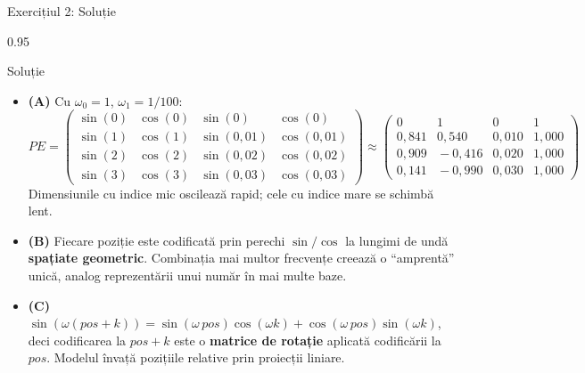 \documentclass[9pt, aspectratio=169, t]{beamer}
\begin{document}
\begin{frame}{Exercițiul 2: Soluție}
    \begin{cminipage}{0.95\textwidth}
    \begin{exampleblock}{Soluție}
        {\scriptsize
        \begin{itemize}\setlength{\itemsep}{1pt}
            \item \textcolor{MainBlue}{\textbf{(A)}} Cu $\omega_0 = 1$, $\omega_1 = 1/100$:
                \[
                    PE = \begin{pmatrix}
                        \sin(0) & \cos(0) & \sin(0) & \cos(0) \\
                        \sin(1) & \cos(1) & \sin(0{,}01) & \cos(0{,}01) \\
                        \sin(2) & \cos(2) & \sin(0{,}02) & \cos(0{,}02) \\
                        \sin(3) & \cos(3) & \sin(0{,}03) & \cos(0{,}03)
                    \end{pmatrix}
                    \approx \begin{pmatrix}
                        0 & 1 & 0 & 1 \\
                        0{,}841 & 0{,}540 & 0{,}010 & 1{,}000 \\
                        0{,}909 & \!-0{,}416 & 0{,}020 & 1{,}000 \\
                        0{,}141 & \!-0{,}990 & 0{,}030 & 1{,}000
                    \end{pmatrix}
                \]
                Dimensiunile cu indice mic oscilează rapid; cele cu indice mare se schimbă lent.
            \item \textcolor{MainBlue}{\textbf{(B)}} Fiecare poziție este codificată prin perechi $\sin/\cos$ la lungimi de undă \textbf{spațiate geometric}. Combinația mai multor frecvențe creează o ``amprentă'' unică, analog reprezentării unui număr în mai multe baze.
            \item \textcolor{MainBlue}{\textbf{(C)}} $\sin(\omega(pos+k)) = \sin(\omega\, pos)\cos(\omega k) + \cos(\omega\, pos)\sin(\omega k)$, deci codificarea la $pos+k$ este o \textbf{matrice de rotație} aplicată codificării la $pos$. Modelul învață pozițiile relative prin proiecții liniare.
        \end{itemize}
        }
    \end{exampleblock}
    \end{cminipage}
\end{frame}
\end{document}
